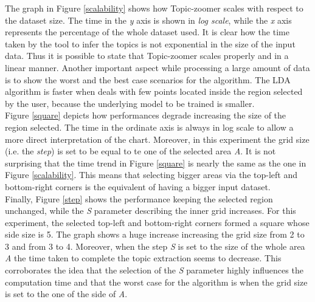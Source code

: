 \documentclass{sig-alternate-05-2015}
\begin{document}
The graph in Figure \ref{scalability} shows how Topic-zoomer scales with respect to the dataset size. The time in the \emph{y} axis is shown in \emph{log scale}, while the \emph{x} axis represents the percentage of the whole dataset used. It is clear how the time taken by the tool to infer the topics is not exponential in the size of the input data. Thus it is possible to state that Topic-zoomer scales properly and in a linear manner.  
Another important aspect while processing a large amount of data is to show the worst and the best case scenarios for the algorithm. The LDA algorithm is faster when deals with few points located inside the region selected by the user, because the underlying model to be trained is smaller.\\
Figure \ref{square} depicts how performances degrade increasing the size of the region selected. The time in the ordinate axis is always in log scale to allow a more direct interpretation of the chart. Moreover, in this experiment the grid size (i.e. the \emph{step}) is set to be equal to te one of the selected area \emph{A}. It is not surprising that the time trend in Figure \ref {square} is nearly the same as the one in Figure \ref{scalability}. This means that selecting bigger areas via the top-left and bottom-right corners is the equivalent of having a bigger input dataset.\\  
Finally, Figure \ref{step} shows the performance keeping the selected region unchanged, while the \emph{S} parameter describing the inner grid increases. For this experiment, the selected top-left and bottom-right corners formed a square whose side size is 5. The graph shows a huge increase increasing the grid size from 2 to 3 and from 3 to 4. Moreover, when the step \emph{S} is set to the size of the whole area \emph{A} the time taken to complete the topic extraction seems to decrease. This corroborates the idea that the selection of the \emph{S} parameter highly influences the computation time and that the worst case for the algorithm is when the grid size is set to the one of the side of \emph{A}.
\end{document}
